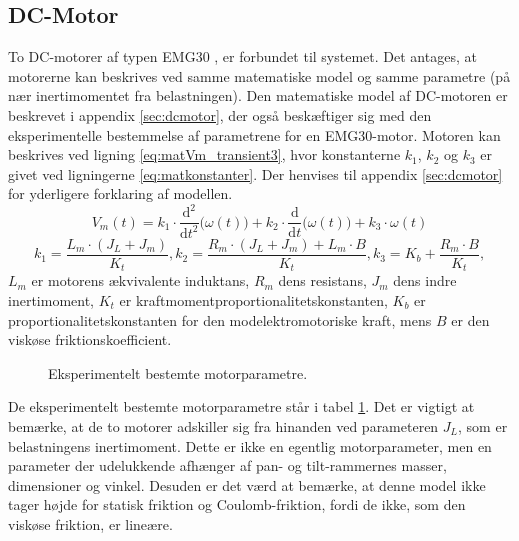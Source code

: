 \subsection{DC-Motor}
To DC-motorer af typen EMG30 \citep{emgmotor}, er forbundet til systemet.
Det antages, at motorerne kan beskrives ved samme matematiske model og samme parametre (på nær inertimomentet fra belastningen).
Den matematiske model af DC-motoren er beskrevet i appendix \ref{sec:dcmotor},
der også beskæftiger sig med den eksperimentelle bestemmelse af parametrene for en EMG30-motor.
Motoren kan beskrives ved ligning \ref{eq:matVm_transient3}, hvor konstanterne \(k_1\), \(k_2\) og \(k_3\)
er givet ved ligningerne \ref{eq:matkonstanter}. Der henvises til appendix \ref{sec:dcmotor}
for yderligere forklaring af modellen.
\begin{equation}
	V_m\left(t\right)=k_1\cdot{}\frac{\mathrm d^2}{\mathrm d t^2} \big(\omega\left(t\right) \big)
		+k_2\cdot{}\frac{\mathrm d}{\mathrm d t} \big(\omega\left(t\right) \big)
		+k_3\cdot{}\omega\left(t\right)
	\label{eq:matVm_transient3}
 \end{equation}
\begin{equation}
	k_1=\frac{L_m\cdot{}\left(J_L+J_m\right)}{K_t},
	k_2=\frac{R_m\cdot{}\left(J_L+J_m\right)+L_m\cdot{}B}{K_t},
	k_3=K_b+\frac{R_m\cdot{}B}{K_t},
	\label{eq:matkonstanter} 
 \end{equation}
\(L_m\) er motorens ækvivalente induktans, \(R_m\) dens resistans, \(J_m\) dens indre inertimoment,
\(K_t\) er kraftmomentproportionalitetskonstanten, \(K_b\) er proportionalitetskonstanten for den modelektromotoriske kraft,
mens \(B\) er den viskøse friktionskoefficient.
\begin{figure}[th!]
	\centering
	
	\captionsetup{type=table}
	\caption[Motorparametre]
			{Eksperimentelt bestemte motorparametre.}
	\label{tb:matmotorparametre}
\end{figure}

De eksperimentelt bestemte motorparametre står i tabel \ref{tb:matmotorparametre}.
Det er vigtigt at bemærke, at de to motorer adskiller sig fra hinanden ved parameteren \(J_L\), som er belastningens
inertimoment. Dette er ikke en egentlig motorparameter, men en parameter der udelukkende afhænger
af pan- og tilt-rammernes masser, dimensioner og vinkel.
Desuden er det værd at bemærke, at denne model ikke tager højde for statisk friktion og Coulomb-friktion,
fordi de ikke, som den viskøse friktion, er lineære. 

